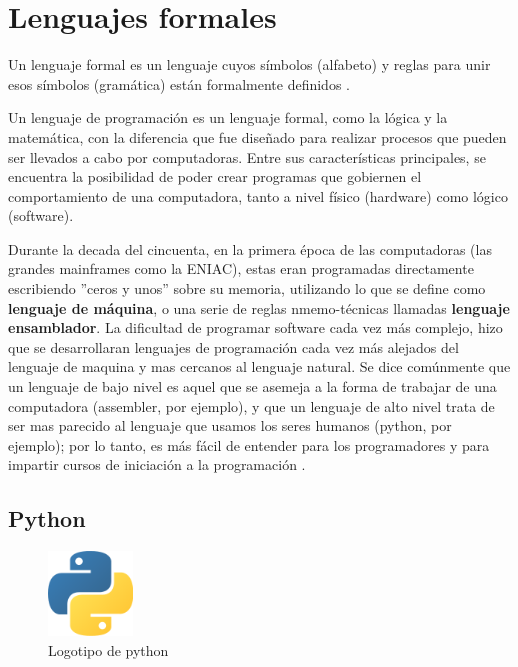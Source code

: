 \section{Lenguajes formales}

Un lenguaje formal es un lenguaje cuyos símbolos (alfabeto) y reglas para unir esos símbolos (gramática) están formalmente definidos \citep{giro_lenguaje_2015}.

Un lenguaje de programación es un lenguaje formal, como la lógica y la matemática, con la diferencia que fue diseñado para realizar procesos que pueden ser llevados a cabo por computadoras. Entre sus características principales, se encuentra la posibilidad de poder crear programas que gobiernen el comportamiento de una computadora, tanto a nivel físico (hardware) como lógico (software).

Durante la decada del cincuenta, en la primera época de las computadoras (las grandes mainframes como la ENIAC), estas eran programadas directamente escribiendo ''ceros y unos'' sobre su memoria, utilizando lo que se define como \textbf{lenguaje de máquina}, o una serie de reglas nmemo-técnicas llamadas \textbf{lenguaje ensamblador}. La dificultad de programar software cada vez más complejo, hizo que se desarrollaran lenguajes de programación cada vez más alejados del lenguaje de maquina y mas cercanos al lenguaje natural. Se dice comúnmente que un lenguaje de bajo nivel es aquel que se asemeja a la forma de trabajar de una computadora (assembler, por ejemplo), y que un lenguaje de alto nivel trata de ser mas parecido al lenguaje que usamos los seres humanos (python, por ejemplo); por lo tanto, es más fácil de entender para los programadores y para impartir cursos de iniciación a la programación \citep{de2016introduccion}.

\subsection{Python}


\begin{figure}
  \begin{center}
    \includegraphics[width=0.2\textwidth]{figuras/Python-logo.png}
    \caption[Caption for LOF]{Logotipo de python}
    
    \label{fig:python_logo}
  \end{center}
\end{figure}

